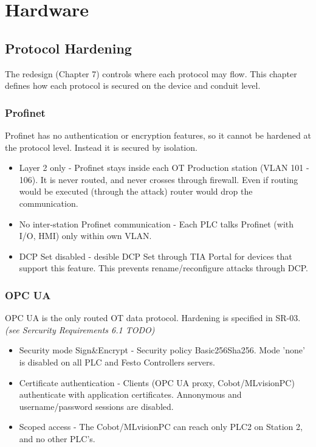 \section{Hardware}

\subsection{Protocol Hardening}
The redesign (Chapter 7) controls where each protocol may flow. 
This chapter defines how each protocol is secured on the device and conduit level.

\subsubsection{Profinet}
Profinet has no authentication or encryption features, so it cannot be hardened at the 
protocol level. Instead it is secured by isolation.
\begin{itemize}
    \item Layer 2 only - Profinet stays inside each OT Production station (VLAN 101 - 106).
        It is never routed, and never crosses through firewall. Even if routing would be 
        executed (through the attack) router would drop the communication.
    \item No inter-station Profinet communication - Each PLC talks Profinet (with I/O, HMI) only 
        within own VLAN.
    \item DCP Set disabled - desible DCP Set through TIA Portal for devices that support this feature.
        This prevents rename/reconfigure attacks through DCP.
\end{itemize}

\subsubsection{OPC UA}
OPC UA is the only routed OT data protocol. Hardening is specified in SR-03. \textit{(see Sercurity Requirements 6.1 TODO)}
\begin{itemize}
    \item Security mode Sign\&Encrypt - Security policy Basic256Sha256. Mode 'none' is disabled
        on all PLC and Festo Controllers servers.
    \item Certificate authentication - Clients (OPC UA proxy, Cobot/MLvisionPC) authenticate with application
        certificates. Annonymous and username/password sessions are disabled.
    \item Scoped access - The Cobot/MLvisionPC can reach only PLC2 on Station 2, and no other PLC's.
\end{itemize}

